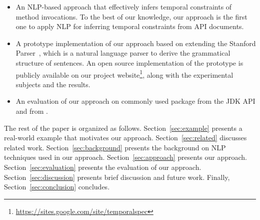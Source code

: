 \begin{itemize}
	\item An NLP-based approach that effectively infers temporal constraints of method invocations. 
	To the best of our knowledge, our approach is the first one to apply NLP for inferring temporal constraints from API documents.
	\item A prototype implementation of our approach based on extending the Stanford Parser~\cite{Klein03}, which is a natural language parser to derive the grammatical structure of sentences.
	An open source implementation of the prototype is publicly available on our project website\footnote{\url{https://sites.google.com/site/temporalspec}}, along with the experimental subjects and the results. 
	\item An evaluation of our approach on commonly used package  from the JDK API and from \amazonAPI. 
\end{itemize}


The rest of the paper is organized as follows.
Section~\ref{sec:example} presents a real-world example that motivates our approach.
Section~\ref{sec:related} discusses related work.
Section~\ref{sec:background} presents the  background on NLP techniques used in our approach.
Section~\ref{sec:approach} presents our approach.
Section~\ref{sec:evaluation} presents the evaluation of our approach.
Section~\ref{sec:discussion} presents brief discussion and future work.
Finally, Section~\ref{sec:conclusion} concludes.





